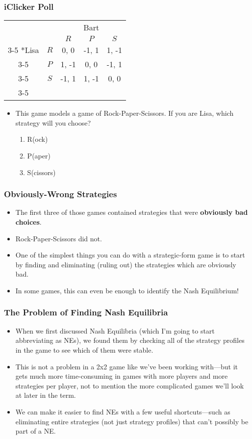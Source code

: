 \begin{frame}
\frametitle{iClicker Poll}
\begin{table}[h]
	\centering
	\begin{tabular}{cc|c|c|c|}
		& \multicolumn{1}{c}{} & \multicolumn{3}{c}{Bart}\\
		& \multicolumn{1}{c}{} & \multicolumn{1}{c}{$R$}  & \multicolumn{1}{c}{$P$} & \multicolumn{1}{c}{$S$} \\\cline{3-5}
		\multirow{3}*{Lisa}  & $R$ & 0, 0 & -1, 1 & 1, -1 \\\cline{3-5}
		& $P$ & 1, -1 & 0, 0 & -1, 1 \\\cline{3-5}
		& $S$ & -1, 1 & 1, -1 & 0, 0 \\\cline{3-5}
	\end{tabular}
\end{table}
\begin{itemize}
	\item This game models a game of Rock-Paper-Scissors. If you are Lisa, which strategy will you choose?
	\begin{enumerate}
		\item R(ock)
		\item P(aper)
		\item S(cissors)
	\end{enumerate}
\end{itemize}
\end{frame}

\begin{frame}
\frametitle{Obviously-Wrong Strategies}
\begin{itemize}
	\item The first three of those games contained strategies that were \textbf{obviously bad choices}.
	\item Rock-Paper-Scissors did not.
	\item One of the simplest things you can do with a strategic-form game is to start by finding and eliminating (ruling out) the strategies which are obviously bad.
	\item In some games, this can even be enough to identify the Nash Equilibrium!
\end{itemize}
\end{frame}

\begin{frame}
\frametitle{The Problem of Finding Nash Equilibria}
\begin{itemize}
	\item When we first discussed Nash Equilibria (which I'm going to start abbreviating as NEs), we found them by checking all of the strategy profiles in the game to see which of them were stable.
	\item This is not a problem in a 2x2 game like we've been working with---but it gets much more time-consuming in games with more players and more strategies per player, not to mention the more complicated games we'll look at later in the term.
	\item We can make it easier to find NEs with a few useful shortcuts---such as eliminating entire strategies (not just strategy profiles) that can't possibly be part of a NE.
\end{itemize}
\end{frame}

